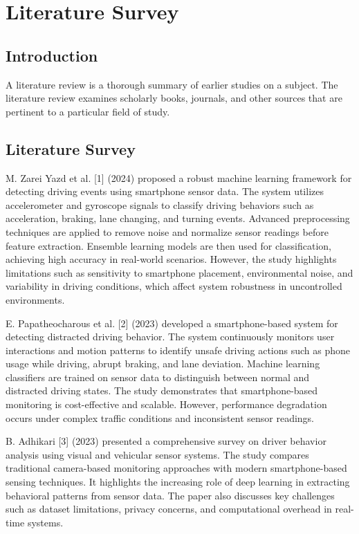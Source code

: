 \chapter{Literature Survey}
\label{chap:literature_review}

\section{Introduction}
\label{sec:lit_intro}
A literature review is a thorough summary of earlier studies on a subject. The literature review examines scholarly books, journals, and other sources that are pertinent to a particular field of study.

\section{Literature Survey}
\label{sec:lit_survey}

M. Zarei Yazd et al. [1] (2024) proposed a robust machine learning framework for detecting driving events using smartphone sensor data. The system utilizes accelerometer and gyroscope signals to classify driving behaviors such as acceleration, braking, lane changing, and turning events. Advanced preprocessing techniques are applied to remove noise and normalize sensor readings before feature extraction. Ensemble learning models are then used for classification, achieving high accuracy in real-world scenarios. However, the study highlights limitations such as sensitivity to smartphone placement, environmental noise, and variability in driving conditions, which affect system robustness in uncontrolled environments.

E. Papatheocharous et al. [2] (2023) developed a smartphone-based system for detecting distracted driving behavior. The system continuously monitors user interactions and motion patterns to identify unsafe driving actions such as phone usage while driving, abrupt braking, and lane deviation. Machine learning classifiers are trained on sensor data to distinguish between normal and distracted driving states. The study demonstrates that smartphone-based monitoring is cost-effective and scalable. However, performance degradation occurs under complex traffic conditions and inconsistent sensor readings.

B. Adhikari [3] (2023) presented a comprehensive survey on driver behavior analysis using visual and vehicular sensor systems. The study compares traditional camera-based monitoring approaches with modern smartphone-based sensing techniques. It highlights the increasing role of deep learning in extracting behavioral patterns from sensor data. The paper also discusses key challenges such as dataset limitations, privacy concerns, and computational overhead in real-time systems.

